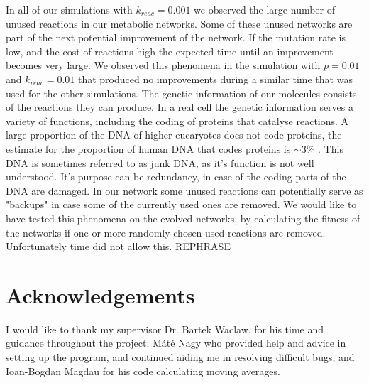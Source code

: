 \documentclass[a4paper,12pt]{article}
\begin{document}
	In all of our simulations with $k_{reac}=0.001$ we observed the large number of unused reactions in our metabolic networks. Some of these unused networks are part of the next potential improvement of the network. If the mutation rate is low, and the cost of reactions high the expected time until an improvement becomes very large. We observed this phenomena in the simulation with $p=0.01$ and $k_{reac}=0.01$ that produced no improvements during a similar time that was used for the other simulations. The genetic information of our molecules consists of the reactions they can produce. In a real cell the genetic information serves a variety of functions, including the coding of proteins that catalyse reactions. A large proportion of the DNA of higher eucaryotes does not code proteins, the estimate for the proportion of human DNA that codes proteins is $\sim 3\%$ \cite{junkdna}. This DNA is sometimes referred to as junk DNA, as it's function is not well understood. It's purpose can be redundancy, in case of the coding parts of the DNA are damaged. In our network some unused reactions can potentially serve as "backups" in case some of the currently used ones are removed. We would like to have tested this phenomena on the evolved networks, by calculating the fitness of the networks if one or more randomly chosen used reactions are removed. Unfortunately time did not allow this.  REPHRASE
	
	\section*{Acknowledgements}
	
	I would like to thank my supervisor Dr. Bartek Waclaw, for his time and guidance throughout the project; Máté Nagy who provided help and advice in setting up the program, and continued aiding me in resolving difficult bugs; and Ioan-Bogdan Magdau for his code calculating moving averages. 

	
	

\end{document}

